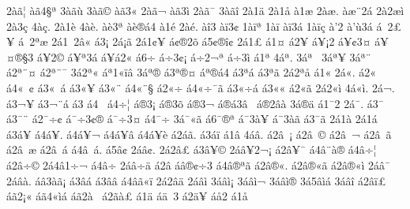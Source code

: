 {2^^e0^^e3^^a6
^^e0^^e34^^a7^^aa
3^^e0^^e3^^f9
3^^e0^^e3^^a9
^^e0^^e33^^ab
2^^e0^^e3^^ac
^^e0^^e33^^ad^^ec
2^^e0^^e3^^af
3^^e0^^e3^^ee
2^^e01^^e4
2^^e01^^e5
^^e01^^e6
2^^e0^^e6.
^^e0^^e6^^a82^^e1
2^^e02^^e6^^ec
2^^e03^^e7
4^^e0^^e7.
2^^e01^^e8
4^^e0^^e8.
^^e0^^e83^^aa
^^e0^^e8^^ae^^e14
^^e01^^e9
2^^e0^^e9.
^^e0^^ee3
^^e0^^ef3^^a2
1^^e0^^ef^^aa
1^^e0^^ef^^ad
^^e0^^ef3^^e1
1^^e0^^ef^^e7
^^e0'2
^^e0'^^f93^^e1
^^e1^^a02^^a3^^a5
^^e1^^a02^^aa^^e6
2^^e11^^a02^^e2^^ab
^^e13^^a1
2^^e1^^a1^^e3
2^^e11^^a2^^a5
^^e1^^a2^^ae2^^f5
^^e15^^a2^^ae^^ee^^a2
2^^e11^^a3
^^e11^^a4
^^e12^^a5
^^e1^^a5^^a12
^^e1^^a5^^a23^^a4
^^e1^^a5^^a4^^ae^^a73
^^e1^^a52^^a9
^^e1^^a5^^aa3^^e1
^^e1^^a5^^e12^^ab
^^e16^^f7
^^e1^^f73^^a2^^a1
^^e1^^f72^^ac^^aa
^^e1^^f73^^ad^^ec
^^e11^^aa
4^^e1^^aa.
3^^e1^^aa^^a0
3^^e1^^aa^^a5
3^^e1^^aa^^a8
^^e12^^aa^^a8^^a4
^^e12^^aa^^a8^^af
3^^e12^^aa^^ab
^^e1^^aa1^^ab^^ef^^e2
3^^e1^^aa^^ae
^^e13^^aa^^ae^^a4
^^e1^^aa^^ae^^e14
^^e13^^aa^^e1
^^e13^^aa^^e3
2^^e12^^aa^^e5
^^e11^^ab
2^^e1^^ab.
^^e12^^ab^^a0
^^e14^^ab^^a0^^a2
^^e13^^ab^^a0^^e1
^^e13^^ab^^a5
^^e13^^ab^^a8
^^e14^^ab^^a8^^a7
^^e12^^ab^^f7
^^e14^^ab^^f7^^af^^e3
^^e13^^ab^^f7^^e1
^^e13^^ab^^ab
^^e12^^ab^^e3
2^^e12^^ab^^ec
4^^e1^^ab^^ec.
2^^e1^^ac.
^^e13^^ac^^a5^^ad
^^e13^^ac^^a8^^e1
^^e13^^ad
^^e14^^ad^^a0
^^e14^^ad^^f7^^a6
^^e1^^ae3^^a1
^^e1^^ae3^^f5
^^e1^^ae3^^ac
^^e1^^ae^^e13^^e2^^a0
^^e1^^ae2^^e2^^e0
3^^e1^^ae^^e4
^^e11^^af2
2^^e1^^af.
^^e13^^af^^a0
^^e13^^af^^a8
^^e12^^af^^f7^^a2
^^e1^^af^^f73^^a2^^ae
^^e1^^af^^f73^^a4^^ad
^^e14^^af^^f7^^ad
3^^e1^^af^^ab^^e3
^^e16^^af^^ae^^aa
^^e1^^af3^^e0^^a5
^^e1^^af3^^e0^^e3
^^e13^^af^^e3
2^^e11^^e0
2^^e11^^e1
^^e13^^e1^^a5
^^e14^^e1^^a5.
^^e14^^e1^^a5^^ac
^^e14^^e1^^a5^^e2
^^e14^^e1^^a5^^e8
^^e12^^e1^^e3.
^^e13^^e1^^ef
^^e11^^e2
4^^e1^^e2.
^^e12^^e2^^a0^^a1
^^e12^^e2^^a0^^a9
^^e12^^e2^^a0^^ac
^^e12^^e2^^a0^^ad^^e3
^^e12^^e2^^a0^^ad^^e6
^^e12^^e2^^a0^^e1
^^e14^^e2^^a0^^e1.
^^e15^^e2^^a2
2^^e1^^e2^^a2.
2^^e12^^e2^^a3
^^e13^^e2^^a5^^a9
2^^e1^^e2^^a52^^ac^^a1
^^e12^^e2^^a5^^af
^^e14^^e2^^a8^^e0^^ae
^^e14^^e2^^f7^^a6
^^e12^^e2^^f7^^a9
2^^e14^^e21^^f7^^ac
^^e14^^e2^^f7^^ad
2^^e1^^e2^^f7^^ad^^e4
^^e12^^e2^^ad
^^e1^^e2^^ae^^a2^^f73
^^e14^^e2^^ae^^aa^^e3
^^e12^^e2^^ae^^ab.
^^e12^^e2^^ae^^ab^^e3
^^e12^^e2^^ae^^ab^^ec
2^^e1^^e2^^af
2^^e1^^e2^^e0.
^^e1^^e23^^e0^^e3^^a1
^^e13^^e2^^e1
^^e13^^e2^^e2
^^e14^^e2^^e3^^ab^^ef
2^^e12^^e2^^e4
2^^e1^^e2^^ec
3^^e1^^e2^^ec^^a1
3^^e1^^e2^^ec^^ac
3^^e1^^e2^^ec^^ae
3^^e15^^e2^^ec^^e1
3^^e1^^e2^^ee
^^e12^^e2^^ef^^a3
^^e1^^e32^^a1^^ab
^^e1^^e34^^ab^^ec^^e1
^^e1^^e32^^e0^^a0
^^e12^^e3^^e0^^a3
^^e11^^e4
^^e1^^e4^^a03
^^e12^^e4^^a5
^^e1^^e52
^^e11^^e5^^a0
}
